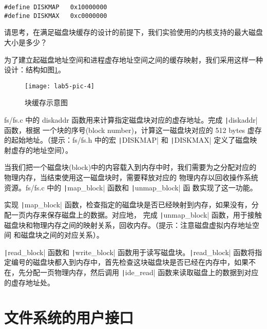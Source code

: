\begin{verbatim}
#define DISKMAP   0x10000000
#define DISKMAX   0xc0000000
\end{verbatim}

\begin{thinking}\label{think-disksize}
请思考，在满足磁盘块缓存的设计的前提下，我们实验使用的内核支持的最大磁盘大小是多少？
\end{thinking}

为了建立起磁盘地址空间和进程虚存地址空间之间的缓存映射，我们采用这样一种设计：结构如图\ref{lab5-pic-4}。

\begin{figure}[htbp]
  \centering
  \texttt{[image: lab5-pic-4]}
  \caption{块缓存示意图}\label{lab5-pic-4}
\end{figure}

\begin{exercise}
fs/fs.c 中的 diskaddr 函数用来计算指定磁盘块对应的虚存地址。完成 \texttt|diskaddr| 函数，根据
一个块的序号(block number)，计算这一磁盘块对应的 512 bytes 虚存的起始地址。（提示：fs/fs.h 中的宏
\texttt|DISKMAP| 和 \texttt|DISKMAX| 定义了磁盘映射虚存的地址空间）。
\end{exercise}

当我们把一个磁盘块(block)中的内容载入到内存中时，我们需要为之分配对应的物理内存，当结束使用这一磁盘块时，需要释放对应的
物理内存以回收操作系统资源。fs/fs.c 中的 \texttt|map_block| 函数和 \texttt|unmap_block| 函
数实现了这一功能。

\begin{exercise}
实现 \texttt|map_block| 函数，检查指定的磁盘块是否已经映射到内存，如果没有，分配一页内存来保存磁盘上的数据。对应地，
完成 \texttt|unmap_block| 函数，用于接触磁盘块和物理内存之间的映射关系，回收内存。（提示：注意磁盘虚拟内存地址空间
和磁盘块之间的对应关系）。
\end{exercise}

\texttt|read_block| 函数和 \texttt|write_block| 函数用于读写磁盘块。\texttt|read_block|
函数将指定编号的磁盘块都入到内存中，首先检查这块磁盘块是否已经在内存中，如果不在，先分配一页物理内存，然后调用
\texttt|ide_read| 函数来读取磁盘上的数据到对应的虚存地址处。



\section{文件系统的用户接口}


